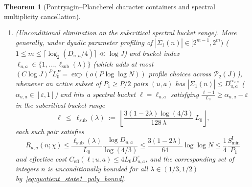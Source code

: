 \documentclass[11pt, a4paper]{article}
\theoremstyle{plain}
\newtheorem{theorem}{Theorem}[section]
\theoremstyle{definition}
\begin{document}
\begin{theorem}[Pontryagin--Plancherel character containers and spectral multiplicity cancellation]
\begin{enumerate}[label=(\alph*)]
\begin{enumerate}[label=(\roman*)]
        \item \emph{(Unconditional elimination on the subcritical spectral bucket range).} 
        More generally, under dyadic parameter profiling of $|\overline{\Sigma}_1(n)|\in[2^{m-1},2^{m})$ ($1\le m\le\allowbreak\lceil\log_2(D_{u,a}/4)\rceil\ll\allowbreak\log J$) and bucket index $\ell_{u,a}\in\allowbreak\{1,\dots,\ell_{\mathrm{sub}}(\lambda)\}$ (which adds at most $(C\log J)^{P}L_0^{P}=\allowbreak\exp(o(P\log\log N))$ profile choices across $\mathcal{P}_2(J)$), whenever an active subset of $P_1\ge P/2$ pairs $(u,a)$ has $|\overline{\Sigma}_1(n)|\le D_{u,a}^{\alpha_{u,a}}$ ($\alpha_{u,a}\in[\varepsilon,1]$) and hits a spectral bucket $\ell=\ell_{u,a}$ satisfying $\frac{\ell-1}{L_0}\ge\alpha_{u,a}-\varepsilon$ in the \emph{subcritical bucket range}
        \begin{equation}\label{eq:subcritical_bucket_range}
        \ell\ \le\ \ell_{\mathrm{sub}}(\lambda)\ :=\ \left\lfloor\frac{3(1-2\lambda)\log(4/3)}{128\,\lambda}\,L_0\right\rfloor,
        \end{equation}
        each such pair satisfies 
        \[
        R_{u,a}(n;\chi)\le\frac{\ell_{\mathrm{sub}}(\lambda)}{L_0}\frac{\log D_{u,a}}{\log(4/3)}\le\frac{3(1-2\lambda)}{64}\log\log N\le\frac14\frac{S_{\min}^{\mathrm{I}}}{P_1}
        \]
        and effective cost $C_{\mathrm{eff}}(\ell;u,a)\le 4L_0 D_{u,a}^{\varepsilon}$, and the corresponding set of integers $n$ is unconditionally bounded for all $\lambda\in(1/3,1/2)$ by~\eqref{eq:quotient_state1_poly_bound}.
    \end{enumerate}
\end{enumerate}
\end{theorem}
\end{document}
